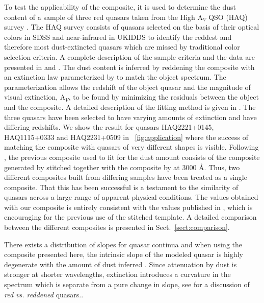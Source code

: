 \documentclass{aa}    %
\newcommand{\figref}[1]{\ref{fig:#1}}
\newcommand{\Fig}[1]{\figurename~\figref{#1}}
\newcommand{\fig}[1]{\Fig{#1}}
\newcommand{\sectionname}{Sect.}
\newcommand{\Sect}[1]{\sectionname~\ref{sect:#1}}
\newcommand{\sect}[1]{\Sect{#1}}
\begin{document}
To test the applicability of the composite, it is used to determine the dust
content of a sample of three red quasars taken from the High A$_V$ QSO (HAQ)
survey \citep{Krogager2015}. The HAQ survey consists of quasars selected on the
basis of their optical colors in SDSS and near-infrared in UKIDDS to identify
the reddest and therefore most dust-extincted quasars which are missed by
traditional color selection criteria. A complete description of the sample
criteria and the data are presented in \citet{Fynbo2013} and
\citet{Krogager2015}. The dust content is inferred by reddening the composite
with an extinction law parameterized by \citet{Gordon2003} to match the object
spectrum. The parameterization allows the redshift of the object quasar and the
magnitude of visual extinction, A$_V$, to be found by minimizing the residuals
between the object and the composite. A detailed description of the fitting
method is given in \cite{Krogager2015}.
The three quasars have been selected to have varying amounts of extinction and
have differing redshifts. We show the result for quasars HAQ2221+0145,
HAQ1115+0333 and HAQ2231+0509 in \fig{application} where the success of matching
the composite with quasars of very different shapes is visible. 
Following \cite{Wang2012}, the previous composite used to fit for the dust
amount consists of the composite generated by \cite{VandenBerk2001} stitched
together with the composite by \cite{Glikman2006} at 3000 \AA. Thus, two
different composites built from differing samples have been treated as a single
composite. That this has been successful is a testament to the similarity of
quasars across a large range of apparent physical conditions. 
The values obtained with our composite is entirely consistent with the values
published in \cite{Krogager2015}, which is encouraging for the previous use of
the stitched template. A detailed comparison between the different composites is
presented in \sect{comparison}. 

There exists a distribution of slopes for quasar continua and when using the composite presented here, the intrinsic slope of the modeled quasar is highly degenerate with the amount of dust inferred \citep{Reichard2003a}. Since attenuation by dust is stronger at shorter wavelengths, extinction introduces a curvature in the spectrum which is separate from a pure change in slope, see
\citet{Krawczyk2015} for a discussion of \textit{red vs. reddened} quasars.. 
\end{document}
